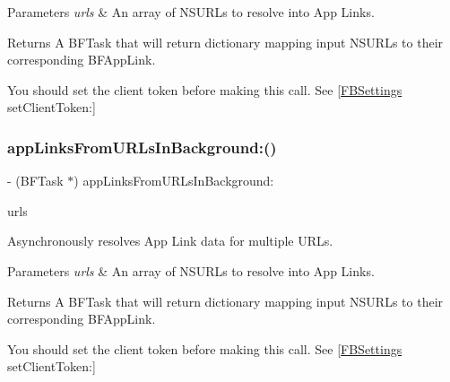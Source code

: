 \begin{DoxyParams}{Parameters}
{\em urls} & An array of N\+S\+U\+R\+Ls to resolve into App Links. \\
\hline
\end{DoxyParams}
\begin{DoxyReturn}{Returns}
A B\+F\+Task that will return dictionary mapping input N\+S\+U\+R\+Ls to their corresponding B\+F\+App\+Link.
\end{DoxyReturn}
You should set the client token before making this call. See {\ttfamily \mbox{[}\hyperlink{interfaceFBSettings}{F\+B\+Settings} set\+Client\+Token\+:\mbox{]}} \mbox{\label{interfaceFBAppLinkResolver_aefdaa81da8bc6105172f4f2632c12daa}} 
\subsubsection{\texorpdfstring{app\+Links\+From\+U\+R\+Ls\+In\+Background\+:()}{appLinksFromURLsInBackground:()}\hspace{0.1cm}{\footnotesize\ttfamily [4/5]}}
{\footnotesize\ttfamily -\/ (B\+F\+Task $\ast$) app\+Links\+From\+U\+R\+Ls\+In\+Background\+: \begin{DoxyParamCaption}\item[{(N\+S\+Array $\ast$)}]{urls }\end{DoxyParamCaption}}

Asynchronously resolves App Link data for multiple U\+R\+Ls.


\begin{DoxyParams}{Parameters}
{\em urls} & An array of N\+S\+U\+R\+Ls to resolve into App Links. \\
\hline
\end{DoxyParams}
\begin{DoxyReturn}{Returns}
A B\+F\+Task that will return dictionary mapping input N\+S\+U\+R\+Ls to their corresponding B\+F\+App\+Link.
\end{DoxyReturn}
You should set the client token before making this call. See {\ttfamily \mbox{[}\hyperlink{interfaceFBSettings}{F\+B\+Settings} set\+Client\+Token\+:\mbox{]}} \mbox{\label{interfaceFBAppLinkResolver_aefdaa81da8bc6105172f4f2632c12daa}} 
